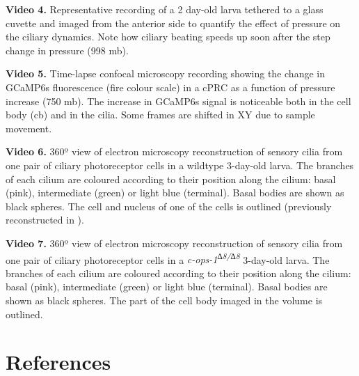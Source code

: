 \documentclass[
  11pt,
]{article}
\begin{document}
\textbf{Video 4.} Representative recording of a 2 day-old larva tethered
to a glass cuvette and imaged from the anterior side to quantify the
effect of pressure on the ciliary dynamics. Note how ciliary beating
speeds up soon after the step change in pressure (998 mb).

\textbf{Video 5.} Time-lapse confocal microscopy recording showing the
change in GCaMP6s fluorescence (fire colour scale) in a cPRC as a
function of pressure increase (750 mb). The increase in GCaMP6s signal
is noticeable both in the cell body (cb) and in the cilia. Some frames
are shifted in XY due to sample movement.

\textbf{Video 6.} 360º view of electron microscopy reconstruction of
sensory cilia from one pair of ciliary photoreceptor cells in a wildtype
3-day-old larva. The branches of each cilium are coloured according to
their position along the cilium: basal (pink), intermediate (green) or
light blue (terminal). Basal bodies are shown as black spheres. The cell
and nucleus of one of the cells is outlined (previously reconstructed in
).

\textbf{Video 7.} 360º view of electron microscopy reconstruction of
sensory cilia from one pair of ciliary photoreceptor cells in a
\emph{c-ops-1\textsuperscript{∆8/∆8}} 3-day-old larva. The branches of
each cilium are coloured according to their position along the cilium:
basal (pink), intermediate (green) or light blue (terminal). Basal
bodies are shown as black spheres. The part of the cell body imaged in
the volume is outlined.

\section*{References}\label{references}
\end{document}
